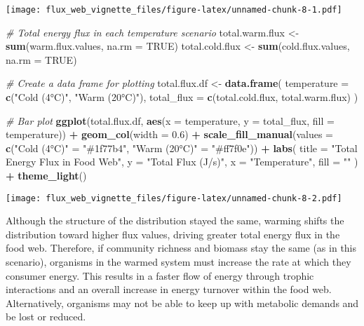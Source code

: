 \documentclass[
]{article}
\newenvironment{Shaded}{\begin{snugshade}}{\end{snugshade}}
\newcommand{\AttributeTok}[1]{\textcolor[rgb]{0.13,0.29,0.53}{#1}}
\newcommand{\CommentTok}[1]{\textcolor[rgb]{0.56,0.35,0.01}{\textit{#1}}}
\newcommand{\ConstantTok}[1]{\textcolor[rgb]{0.56,0.35,0.01}{#1}}
\newcommand{\FloatTok}[1]{\textcolor[rgb]{0.00,0.00,0.81}{#1}}
\newcommand{\FunctionTok}[1]{\textcolor[rgb]{0.13,0.29,0.53}{\textbf{#1}}}
\newcommand{\NormalTok}[1]{#1}
\newcommand{\OtherTok}[1]{\textcolor[rgb]{0.56,0.35,0.01}{#1}}
\newcommand{\SpecialCharTok}[1]{\textcolor[rgb]{0.81,0.36,0.00}{\textbf{#1}}}
\newcommand{\StringTok}[1]{\textcolor[rgb]{0.31,0.60,0.02}{#1}}
\begin{document}
\texttt{[image: flux\_web\_vignette\_files/figure-latex/unnamed-chunk-8-1.pdf]}

\begin{Shaded}
\begin{Highlighting}[]
\CommentTok{\# Total energy flux in each temperature scenario}
\NormalTok{total.warm.flux }\OtherTok{\textless{}{-}} \FunctionTok{sum}\NormalTok{(warm.flux.values, }\AttributeTok{na.rm =} \ConstantTok{TRUE}\NormalTok{)}
\NormalTok{total.cold.flux }\OtherTok{\textless{}{-}} \FunctionTok{sum}\NormalTok{(cold.flux.values, }\AttributeTok{na.rm =} \ConstantTok{TRUE}\NormalTok{)}

\CommentTok{\# Create a data frame for plotting}
\NormalTok{total.flux.df }\OtherTok{\textless{}{-}} \FunctionTok{data.frame}\NormalTok{(}
  \AttributeTok{temperature =} \FunctionTok{c}\NormalTok{(}\StringTok{"Cold (4°C)"}\NormalTok{, }\StringTok{"Warm (20°C)"}\NormalTok{),}
  \AttributeTok{total\_flux =} \FunctionTok{c}\NormalTok{(total.cold.flux, total.warm.flux)}
\NormalTok{)}

\CommentTok{\# Bar plot}
\FunctionTok{ggplot}\NormalTok{(total.flux.df, }\FunctionTok{aes}\NormalTok{(}\AttributeTok{x =}\NormalTok{ temperature, }\AttributeTok{y =}\NormalTok{ total\_flux, }\AttributeTok{fill =}\NormalTok{ temperature)) }\SpecialCharTok{+}
  \FunctionTok{geom\_col}\NormalTok{(}\AttributeTok{width =} \FloatTok{0.6}\NormalTok{) }\SpecialCharTok{+}
  \FunctionTok{scale\_fill\_manual}\NormalTok{(}\AttributeTok{values =} \FunctionTok{c}\NormalTok{(}\StringTok{"Cold (4°C)"} \OtherTok{=} \StringTok{"\#1f77b4"}\NormalTok{, }\StringTok{"Warm (20°C)"} \OtherTok{=} \StringTok{"\#ff7f0e"}\NormalTok{)) }\SpecialCharTok{+}
  \FunctionTok{labs}\NormalTok{(}
    \AttributeTok{title =} \StringTok{"Total Energy Flux in Food Web"}\NormalTok{,}
    \AttributeTok{y =} \StringTok{"Total Flux (J/s)"}\NormalTok{,}
    \AttributeTok{x =} \StringTok{"Temperature"}\NormalTok{,}
    \AttributeTok{fill =} \StringTok{""}
\NormalTok{  ) }\SpecialCharTok{+}
  \FunctionTok{theme\_light}\NormalTok{()}
\end{Highlighting}
\end{Shaded}

\texttt{[image: flux\_web\_vignette\_files/figure-latex/unnamed-chunk-8-2.pdf]}

Although the structure of the distribution stayed the same, warming
shifts the distribution toward higher flux values, driving greater total
energy flux in the food web. Therefore, if community richness and
biomass stay the same (as in this scenario), organisms in the warmed
system must increase the rate at which they consumer energy. This
results in a faster flow of energy through trophic interactions and an
overall increase in energy turnover within the food web. Alternatively,
organisms may not be able to keep up with metabolic demands and be lost
or reduced.
\end{document}
